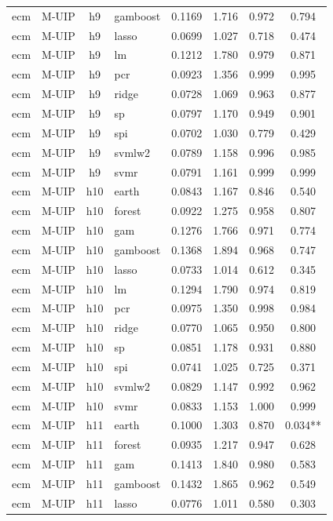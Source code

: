 \begin{ThreePartTable}
\begin{longtable}[t]{llclcccc}
ecm & M-UIP & h9 & gamboost & 0.1169 & 1.716 & 0.972 & 0.794\\
ecm & M-UIP & h9 & lasso & 0.0699 & 1.027 & 0.718 & 0.474\\
ecm & M-UIP & h9 & lm & 0.1212 & 1.780 & 0.979 & 0.871\\
ecm & M-UIP & h9 & pcr & 0.0923 & 1.356 & 0.999 & 0.995\\
ecm & M-UIP & h9 & ridge & 0.0728 & 1.069 & 0.963 & 0.877\\
ecm & M-UIP & h9 & sp & 0.0797 & 1.170 & 0.949 & 0.901\\
ecm & M-UIP & h9 & spi & 0.0702 & 1.030 & 0.779 & 0.429\\
ecm & M-UIP & h9 & svmlw2 & 0.0789 & 1.158 & 0.996 & 0.985\\
ecm & M-UIP & h9 & svmr & 0.0791 & 1.161 & 0.999 & 0.999\\
\addlinespace
ecm & M-UIP & h10 & earth & 0.0843 & 1.167 & 0.846 & 0.540\\
ecm & M-UIP & h10 & forest & 0.0922 & 1.275 & 0.958 & 0.807\\
ecm & M-UIP & h10 & gam & 0.1276 & 1.766 & 0.971 & 0.774\\
ecm & M-UIP & h10 & gamboost & 0.1368 & 1.894 & 0.968 & 0.747\\
ecm & M-UIP & h10 & lasso & 0.0733 & 1.014 & 0.612 & 0.345\\
ecm & M-UIP & h10 & lm & 0.1294 & 1.790 & 0.974 & 0.819\\
ecm & M-UIP & h10 & pcr & 0.0975 & 1.350 & 0.998 & 0.984\\
ecm & M-UIP & h10 & ridge & 0.0770 & 1.065 & 0.950 & 0.800\\
ecm & M-UIP & h10 & sp & 0.0851 & 1.178 & 0.931 & 0.880\\
ecm & M-UIP & h10 & spi & 0.0741 & 1.025 & 0.725 & 0.371\\
ecm & M-UIP & h10 & svmlw2 & 0.0829 & 1.147 & 0.992 & 0.962\\
ecm & M-UIP & h10 & svmr & 0.0833 & 1.153 & 1.000 & 0.999\\
\addlinespace
ecm & M-UIP & h11 & earth & 0.1000 & 1.303 & 0.870 & 0.034**\\
ecm & M-UIP & h11 & forest & 0.0935 & 1.217 & 0.947 & 0.628\\
ecm & M-UIP & h11 & gam & 0.1413 & 1.840 & 0.980 & 0.583\\
ecm & M-UIP & h11 & gamboost & 0.1432 & 1.865 & 0.962 & 0.549\\
ecm & M-UIP & h11 & lasso & 0.0776 & 1.011 & 0.580 & 0.303\\

\end{longtable}
\end{ThreePartTable}
